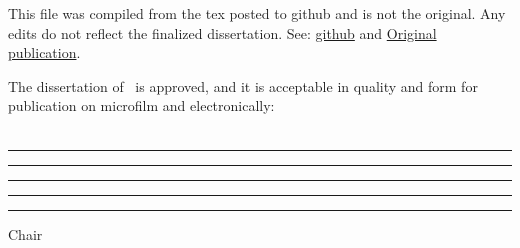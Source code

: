         \pagebreak
        \thispagestyle{plain}
        \setcounter{page}{3}
        \renewcommand{\thepage}{\roman{page}}
        \vfill
            {\tiny This file was compiled from the tex posted to github and is not the original. Any edits do not reflect the finalized dissertation. See: \href{https://github.com/CBroz1/DissertationLaTeX}{github} and \href{https://escholarship.org/uc/item/2kk8z7sx}{Original publication}. \par}

            \noindent The dissertation of \myname\ is approved, and it is acceptable in quality and form for publication on microfilm and electronically: \\~\\
            
            \noindent\rule{\textwidth}{1pt}
            \vspace{2\baselineskip}
            
            \noindent\rule{\textwidth}{1pt}
            \vspace{2\baselineskip}
                        
            \noindent\rule{\textwidth}{1pt}
            \vspace{2\baselineskip}
            
            \noindent\rule{\textwidth}{1pt}
            \vspace{2\baselineskip}
            
            \noindent\rule{\textwidth}{1pt}
            \vspace{2\baselineskip}
            \hspace*{\fill} Chair

